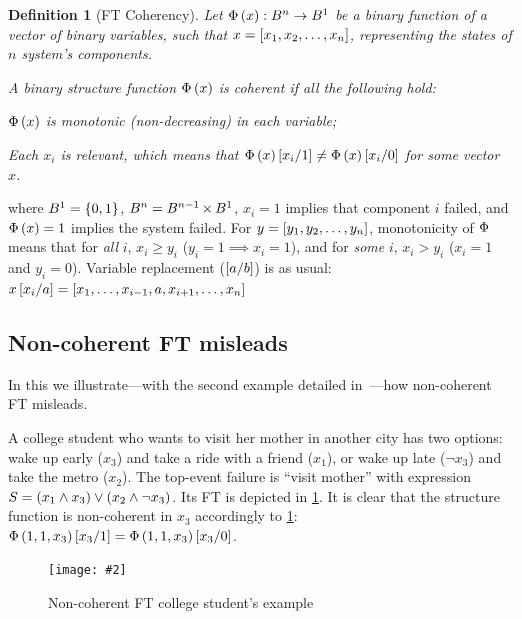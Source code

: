 \documentclass[12pt,openright,twoside,a4paper,oldfontcommands,english,brazil,final]{abntex2}
\newtheorem{definition}{Definition}[chapter]
\theoremstyle{theo}
\newcommand{\includegraphicsaspectratio}[2][1]{%
  \texttt{[image: \#2]}%
}
\newcommand{\setsin}[1]{\ensuremath\left\{ #1 \right\}}
\newcommand{\parsin}[1]{\ensuremath\left( #1 \right)}
\newcommand{\squaresin}[1]{\ensuremath\left[ #1 \right]}
\def\cartesian{\ensuremath\operatorname{\times}}
\def\ftcoherencyop{\ensuremath\operatorname{\Phi}}
\newcommand{\ftcoherency}[1]{\ensuremath\ftcoherencyop\parsin{#1}}
\newcommand{\replace}[2]{\ensuremath\squaresin{#1\middle/#2}}
\begin{document}
\begin{definition}[\ac{FT} Coherency]
\label{def:ft-coherency}
Let $\ftcoherency{x}:B^n \rightarrow B^1$ be a binary function of a vector of binary variables, such that $x = \squaresin{x_1, x_2,\ldots,x_n}$, representing the states of $n$ system's components.

A binary structure function $\ftcoherency{x}$ is coherent if all the following hold:
\begin{alineas}
  \item $\ftcoherency{x}$ is monotonic (non-decreasing) in each variable;
  \item Each $x_i$ is relevant, which means that $\ftcoherency{x}\replace{x_i}{1} \neq \ftcoherency{x}\replace{x_i}{0}$ for some vector $x$.
\end{alineas}%
\end{definition}%
%
\noindent where $B^1 = \setsin{0,1}$, $B^n = B^{n-1} \cartesian B^1$, $x_i = 1$ implies that component $i$ failed, and $\ftcoherency{x} = 1$ implies the system failed.
For $y = \squaresin{y_1,y_2,\ldots,y_n}$, monotonicity of $\ftcoherencyop$ means that for \emph{all} $i$, $x_i \ge y_i$ ($y_i = 1 \implies x_i = 1$), and for \emph{some} $i$, $x_i > y_i$ ($x_i = 1$ and $y_i = 0$).
Variable replacement ($\replace{a}{b}$) is as usual:
$x\replace{x_i}{a} = \squaresin{x_1, \ldots, x_{i-1}, a, x_{i+1}, \ldots, x_n}$

\subsection{Non-coherent \acl*{FT} misleads}
\label{sec:non-coherent-misleads-example}

In this  we illustrate---with the second example detailed in~\cite{Oliv2006}---how non-coherent \ac{FT} misleads.

A college student who wants to visit her mother in another city has two options: wake up early ($x_3$) and take a ride with a friend ($x_1$), or wake up late ($\lnot x_3$) and take the metro ($x_2$).
The top-event failure is ``visit mother'' with expression $S = \parsin{x_1 \land x_3} \lor \parsin{x_2 \land \lnot x_3}$.
Its \acl{FT} is depicted in \cref{fig:non-coherent-ft-example}.
It is clear that the structure function is non-coherent in $x_3$ accordingly to \cref{def:ft-coherency}: $\ftcoherency{1,1,x_3}\replace{x_3}{1}=\ftcoherency{1,1,x_3}\replace{x_3}{0}$.

\begin{figure}[htb]
  \centering
  \includegraphicsaspectratio[0.55]{non-coherent-ft-example}
  \caption{Non-coherent \ac{FT} college student's example}
  \label{fig:non-coherent-ft-example}
\end{figure}
\end{document}
